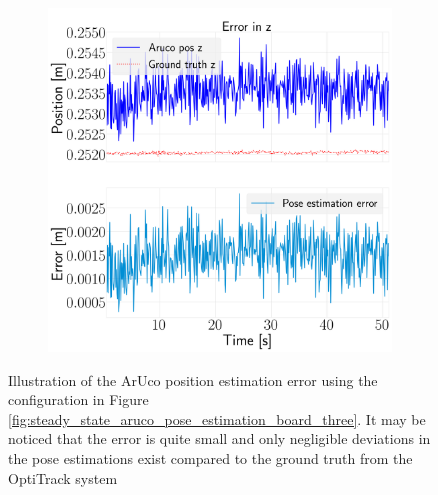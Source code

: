 \documentclass[../Head/report.tex]{subfiles}
\begin{document}
\begin{figure}[H]
\begin{subfigure}[t]{.30\textwidth}
        \caption{}
        \label{fig:optitrack_steady_state_pose_estimation_error_y_test_five}
    \end{subfigure}
     \hspace{0.2em}
    \begin{subfigure}[t]{.30\textwidth}
        \centering
        \includegraphics[width=\textwidth]{../Figures/optitrack/steady_aruco_pose_estimation/pose_error_z_test1.png}
        \caption{}
        \label{fig:optitrack_steady_state_pose_estimation_error_z_test_five}
    \end{subfigure}
    \caption{Illustration of the ArUco position estimation error using the configuration in Figure \ref{fig:steady_state_aruco_pose_estimation_board_three}. It may be noticed that the error is quite small and only negligible deviations in the pose estimations exist compared to the ground truth from the OptiTrack system} 
    \label{fig:optitrack_steady_state_pose_estimation_error_pos_test_five}
\end{figure}
\end{document}
